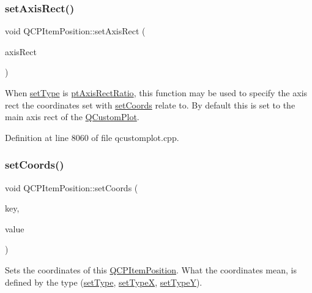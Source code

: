 \mbox{\label{class_q_c_p_item_position_a0cd9b326fb324710169e92e8ca0041c2}} 
\subsubsection{\texorpdfstring{set\+Axis\+Rect()}{setAxisRect()}}
{\footnotesize\ttfamily void Q\+C\+P\+Item\+Position\+::set\+Axis\+Rect (\begin{DoxyParamCaption}\item[{\hyperlink{class_q_c_p_axis_rect}{Q\+C\+P\+Axis\+Rect} $\ast$}]{axis\+Rect }\end{DoxyParamCaption})}

When \hyperlink{class_q_c_p_item_position_aa476abf71ed8fa4c537457ebb1a754ad}{set\+Type} is \hyperlink{class_q_c_p_item_position_aad9936c22bf43e3d358552f6e86dbdc8a01080fd00eaf09fa238ef6b73bbfef75}{pt\+Axis\+Rect\+Ratio}, this function may be used to specify the axis rect the coordinates set with \hyperlink{class_q_c_p_item_position_aa988ba4e87ab684c9021017dcaba945f}{set\+Coords} relate to. By default this is set to the main axis rect of the \hyperlink{class_q_custom_plot}{Q\+Custom\+Plot}. 

Definition at line 8060 of file qcustomplot.\+cpp.

\mbox{\label{class_q_c_p_item_position_aa988ba4e87ab684c9021017dcaba945f}} 
\subsubsection{\texorpdfstring{set\+Coords()}{setCoords()}\hspace{0.1cm}{\footnotesize\ttfamily [1/2]}}
{\footnotesize\ttfamily void Q\+C\+P\+Item\+Position\+::set\+Coords (\begin{DoxyParamCaption}\item[{double}]{key,  }\item[{double}]{value }\end{DoxyParamCaption})}

Sets the coordinates of this \hyperlink{class_q_c_p_item_position}{Q\+C\+P\+Item\+Position}. What the coordinates mean, is defined by the type (\hyperlink{class_q_c_p_item_position_aa476abf71ed8fa4c537457ebb1a754ad}{set\+Type}, \hyperlink{class_q_c_p_item_position_a2113b2351d6d00457fb3559a4e20c3ea}{set\+TypeX}, \hyperlink{class_q_c_p_item_position_ac2a454aa5a54c1615c50686601ec4510}{set\+TypeY}).

